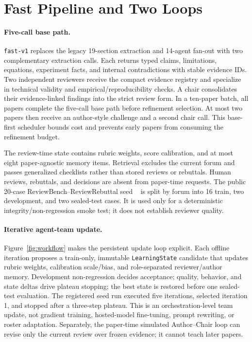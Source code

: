 \documentclass{article}
\begin{document}
\section{Fast Pipeline and Two Loops}

\paragraph{Five-call base path.}
\texttt{fast-v1} replaces the legacy 19-section extraction and 14-agent fan-out
with two complementary extraction calls. Each returns typed claims,
limitations, equations, experiment facts, and internal contradictions with
stable evidence IDs. Two independent reviewers receive the compact evidence
registry and specialize in technical validity and empirical/reproducibility
checks. A chair consolidates their evidence-linked findings into the strict
review form. In a ten-paper batch, all papers complete the five-call base path
before refinement selection. At most two papers then receive an author-style
challenge and a second chair call. This base-first scheduler bounds cost and
prevents early papers from consuming the refinement budget.

The review-time state contains rubric weights, score calibration, and at most
eight paper-agnostic memory items. Retrieval excludes the current forum and
passes generalized checklists rather than stored reviews or rebuttals. Human
reviews, rebuttals, and decisions are absent from paper-time requests. The
public 20-case ReviewBench--ReviewRebuttal seed
~\cite{reviewbenchdataset,reviewrebuttaldataset} is split by forum into 16
train, two development, and two sealed-test cases. It is used only for a
deterministic integrity/non-regression smoke test; it does not establish
reviewer quality.

\paragraph{Iterative agent-team update.}
Figure~\ref{fig:workflow} makes the persistent update loop explicit. Each
offline iteration proposes a train-only, immutable \texttt{LearningState}
candidate that updates rubric weights, calibration scale/bias, and
role-separated reviewer/author memory. Development non-regression decides
acceptance; quality, behavior, and state deltas drive plateau stopping; the
best state is restored before one sealed-test evaluation. The registered seed
run executed five iterations, selected iteration 1, and stopped after a
three-step plateau. This is an orchestration-level team update, not gradient
training, hosted-model fine-tuning, prompt rewriting, or roster adaptation.
Separately, the paper-time simulated Author--Chair loop can revise only the
current review over frozen evidence; it cannot teach later papers.
\end{document}
